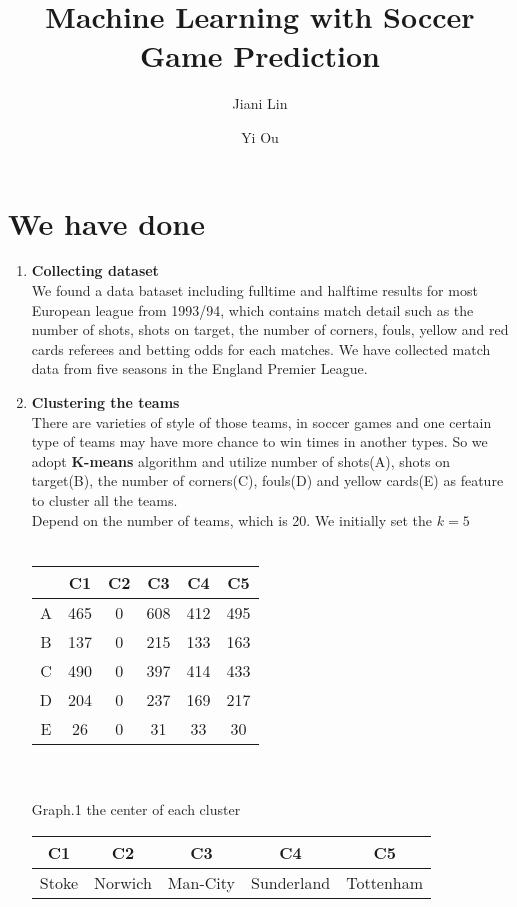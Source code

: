 \documentclass[a4paper,11pt,fleqn]{article}
\title{\textbf{Machine Learning with Soccer Game Prediction}}
\author{Jiani Lin \and Yi Ou}
\begin{document}
\maketitle

\section{We have done}
\begin{enumerate}
\item \textbf{Collecting dataset} \\
We found a data bataset including fulltime and halftime results for most European league from 1993/94, which contains match detail such as the number of shots, shots on target, the number of corners, fouls, yellow and red cards referees and betting odds for each matches. We have collected match data from five seasons in the England Premier League. 
\item \textbf{Clustering the teams}\\
There are varieties of style of those teams, in soccer games and one certain type of teams may have more chance to win times in another types. So we adopt \textbf{K-means} algorithm and utilize number of shots(A), shots on target(B), the number of corners(C), fouls(D) and yellow cards(E) as feature to cluster all the teams.\\
Depend on the number of teams, which is 20. We initially set the $k=5$\\
\ \\
\begin{center}

\begin{tabular}{|c|ccccc|}
      \hline
             &C1 & C2  & C3 & C4 & C5\\
      \hline
      A     & 465  & 0 & 608 & 412 & 495 \\
      B     & 137  & 0 &215& 133 & 163\\
      C     & 490 & 0 &397& 414 &433\\
      D     & 204  & 0 &237 &169&217\\
      E     & 26 & 0 &31&33&30\\
      \hline
    \end{tabular}\\
    \ \\
    {\small Graph.1 the center of each cluster}
\end{center}
\begin{center}

\begin{tabular}{|ccccc|}
      \hline
          C1 & C2  & C3 & C4 & C5\\
      \hline
       Stoke  & Norwich & Man-City & Sunderland & Tottenham \\
       

\end{tabular}
\end{center}
\end{enumerate}
\end{document}
